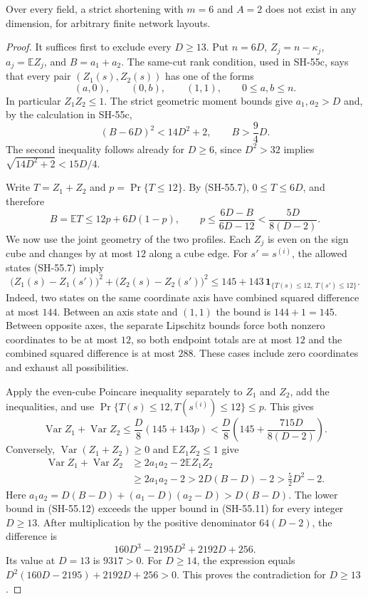 \begin{theorem}
\label{thm:width-six-two-term-joint-edge}
Over every field, a strict shortening with $m=6$ and
$A=2$ does not exist in any dimension, for arbitrary
finite network layouts.
\end{theorem}
\begin{proof}
It suffices first to exclude every $D\geq13$.
Put $n=6D$, $Z_j=n-\kappa_j$, $a_j=\mathbb EZ_j$,
and $B=a_1+a_2$.  The same-cut rank condition, used in
SH-55c, says that every pair $(Z_1(s),Z_2(s))$ has one
of the forms
\[
                  (a,0),\qquad(0,b),\qquad(1,1),
                  \qquad 0\leq a,b\leq n.
 \tag{SH-55.7}
\]
In particular $Z_1Z_2\leq1$.  The strict geometric
moment bounds give $a_1,a_2>D$ and, by the calculation
in SH-55c,
\[
 (B-6D)^2<14D^2+2,
 \qquad B>\frac94D.
 \tag{SH-55.8}
\]
The second inequality follows already for $D\geq6$,
since $D^2>32$ implies
$\sqrt{14D^2+2}<15D/4$.

Write $T=Z_1+Z_2$ and $p=\Pr\{T\leq12\}$.
By (SH-55.7), $0\leq T\leq6D$, and therefore
\[
 B=\mathbb ET\leq12p+6D(1-p),
 \qquad
 p\leq\frac{6D-B}{6D-12}
       <\frac{5D}{8(D-2)}.
 \tag{SH-55.9}
\]
We now use the joint geometry of the two profiles.
Each $Z_j$ is even on the sign cube and changes by at
most $12$ along a cube edge.  For $s'=s^{(i)}$, the
allowed states (SH-55.7) imply
\[
 \bigl(Z_1(s)-Z_1(s')\bigr)^2+
 \bigl(Z_2(s)-Z_2(s')\bigr)^2
 \leq145+143\,\mathbf1_{
            \{T(s)\leq12,\ T(s')\leq12\}}.
 \tag{SH-55.10}
\]
Indeed, two states on the same coordinate axis have
combined squared difference at most $144$.  Between
an axis state and $(1,1)$ the bound is $144+1=145$.
Between opposite axes, the separate Lipschitz bounds
force both nonzero coordinates to be at most $12$,
so both endpoint totals are at most $12$ and the
combined squared difference is at most $288$.
These cases include zero coordinates and exhaust all
possibilities.

Apply the even-cube Poincare inequality separately to
$Z_1$ and $Z_2$, add the inequalities, and use
$\Pr\{T(s)\leq12,T(s^{(i)})\leq12\}\leq p$.
This gives
\[
 \operatorname{Var}Z_1+\operatorname{Var}Z_2
 \leq\frac D8(145+143p)
 <\frac D8\left(145+\frac{715D}{8(D-2)}\right).
 \tag{SH-55.11}
\]
Conversely, $\operatorname{Var}(Z_1+Z_2)\geq0$ and
$\mathbb EZ_1Z_2\leq1$ give
\[
\begin{split}
 \operatorname{Var}Z_1+\operatorname{Var}Z_2
 &\geq2a_1a_2-2\mathbb EZ_1Z_2\\
 &\geq2a_1a_2-2
 >2D(B-D)-2
 >\frac52D^2-2.
\end{split}
 \tag{SH-55.12}
\]
Here $a_1a_2=D(B-D)+(a_1-D)(a_2-D)>D(B-D)$.
The lower bound in (SH-55.12) exceeds the upper bound
in (SH-55.11) for every integer $D\geq13$.
After multiplication by the positive denominator
$64(D-2)$, the difference is
\[
             160D^3-2195D^2+2192D+256.
 \tag{SH-55.13}
\]
Its value at $D=13$ is $9317>0$.  For $D\geq14$,
the expression equals
$D^2(160D-2195)+2192D+256>0$.
This proves the contradiction for $D\geq13$.


\end{proof}
